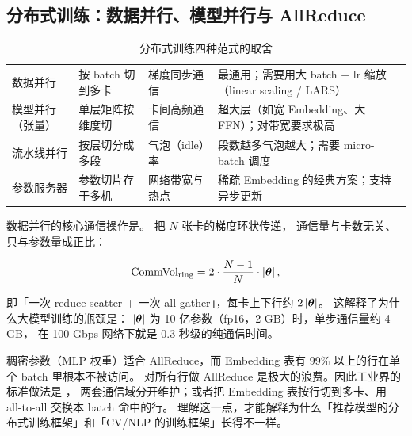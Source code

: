 \subsection{分布式训练：数据并行、模型并行与 AllReduce}

\begin{table}[htbp]
\centering
\caption{分布式训练四种范式的取舍}
\label{tab:parallel}
\small
\begin{tabularx}{\textwidth}{L{2.1cm} L{2.5cm} L{2.4cm} Y}
\toprule
{} &  &  &  \\
\midrule
数据并行 & 按 batch 切到多卡 & 梯度同步通信 & 最通用；需要用大 batch + lr 缩放（linear scaling / LARS） \\
\addlinespace
模型并行（张量） & 单层矩阵按维度切 & 卡间高频通信 & 超大层（如宽 Embedding、大 FFN）；对带宽要求极高 \\
\addlinespace
流水线并行 & 按层切分成多段 & 气泡（idle）率 & 段数越多气泡越大；需要 micro-batch 调度 \\
\addlinespace
参数服务器 & 参数切片存于多机 & 网络带宽与热点 & 稀疏 Embedding 的经典方案；支持异步更新 \\
\bottomrule
\end{tabularx}
\end{table}

数据并行的核心通信操作是。 把 $N$ 张卡的梯度环状传递，
通信量与卡数无关、只与参数量成正比：

\begin{equation}
\text{CommVol}_{\text{ring}} = 2 \cdot \frac{N-1}{N} \cdot \left\lvert \bm{\theta} \right\rvert ,
\label{eq:allreduce}
\end{equation}

即「一次 reduce-scatter + 一次 all-gather」，每卡上下行约 $2\left\lvert \bm{\theta} \right\rvert$。
这解释了为什么大模型训练的瓶颈是：
$\left\lvert \bm{\theta} \right\rvert$ 为 10 亿参数（fp16，2 GB）时，单步通信量约 4 GB，
在 100 Gbps 网络下就是 0.3 秒级的纯通信时间。

\begin{insight}
稠密参数（MLP 权重）适合 AllReduce，而 Embedding 表有 99\% 以上的行在单个 batch 里根本不被访问。
对所有行做 AllReduce 是极大的浪费。因此工业界的标准做法是
，
两套通信域分开维护；或者把 Embedding 表按行切到多卡、用 all-to-all 交换本 batch 命中的行。
理解这一点，才能解释为什么「推荐模型的分布式训练框架」和「CV/NLP 的训练框架」长得不一样。
\end{insight}


